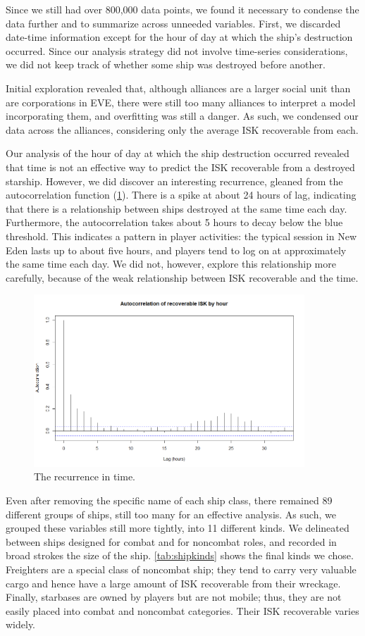\documentclass[letterpaper,12pt,article]{memoir}
\begin{document}
Since we still had over 800,000 data points, we found it necessary to condense
the data further and to summarize across unneeded variables. First, we discarded
date-time information except for the hour of day at which the ship's destruction
occurred. Since our analysis strategy did not involve time-series 
considerations, we did not keep track of whether some ship was destroyed before 
another. 

Initial exploration revealed that, although alliances are a larger social unit 
than are corporations in EVE, there were still too many alliances to interpret
a model incorporating them, and overfitting was still a danger. As such, we 
condensed our data across the alliances, considering only the average ISK
recoverable from each.

Our analysis of the hour of day at which the ship destruction occurred revealed
that time is not an effective way to predict the ISK recoverable from a
destroyed starship. However, we did discover an interesting recurrence, gleaned
from the autocorrelation function (\cref{fig:acf}). There is a spike at about
24 hours of lag, indicating that there is a relationship between ships 
destroyed at the same time each day. Furthermore, the autocorrelation takes about
5 hours to decay below the blue threshold. This indicates a pattern in player
activities: the typical session in New Eden lasts up to about five hours, and
players tend to log on at approximately the same time each day. We did not,
however, explore this relationship more carefully, because of the weak 
relationship between ISK recoverable and the time.

\begin{figure}[ht]
    \centering
    \includegraphics[width=4in]{ACF_byHour.png}
    \caption{The recurrence in time.}
    \label{fig:acf}
\end{figure}

Even after removing the specific name of each ship class, there remained 89
different groups of ships, still too many for an effective analysis. As such,
we grouped these variables still more tightly, into 11 different kinds. We
delineated between ships designed for combat and for noncombat roles, and 
recorded in broad strokes the size of the ship. \cref{tab:shipkinds} shows
the final kinds we chose. Freighters are a special class of noncombat ship;
they tend to carry very valuable cargo and hence have a large amount of ISK
recoverable from their wreckage. Finally, starbases are owned by players but
are not mobile; thus, they are not easily placed into combat and noncombat 
categories. Their ISK recoverable varies widely.
\end{document}
